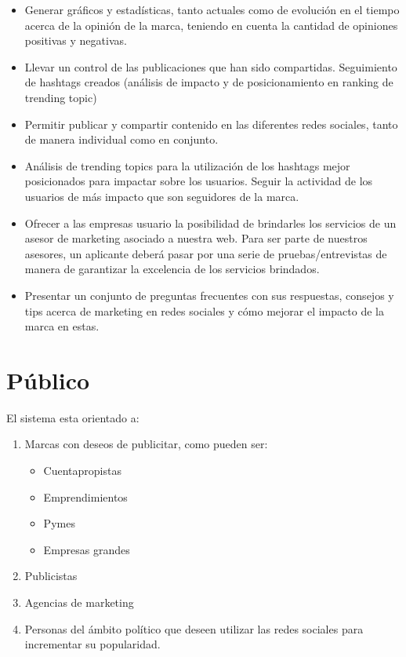 \documentclass[oneside]{book}
\begin{document}
\begin{itemize}
\item Generar gráficos y estad\'{i}sticas, tanto actuales como de evoluci\'{o}n en el tiempo acerca de la opini\'{o}n de la marca, teniendo en cuenta la cantidad de opiniones positivas y negativas.

\item Llevar un control de las publicaciones que han sido compartidas.
Seguimiento de hashtags creados (an\'{a}lisis de impacto y de posicionamiento en ranking de trending topic)

\item Permitir publicar y compartir contenido en las diferentes redes sociales, tanto de manera individual como en conjunto. 

\item Análisis de trending topics para la utilización de los hashtags mejor posicionados para impactar sobre los usuarios.
Seguir la actividad de los usuarios de más impacto que son seguidores de la marca. 

\item Ofrecer a las empresas usuario la posibilidad de brindarles los servicios de un asesor de marketing asociado a nuestra web. Para ser parte de nuestros asesores, un aplicante deber\'{a} pasar por una serie de pruebas/entrevistas de manera de garantizar la excelencia de los servicios brindados. 

\item Presentar un conjunto de preguntas frecuentes con sus respuestas, consejos y tips acerca de marketing en redes sociales y cómo mejorar el impacto de la marca en estas.


\end{itemize}


\section{P\'{u}blico}


El sistema esta orientado a:

\begin{enumerate}
	\item Marcas con deseos de publicitar, como pueden ser:
	\begin{itemize}
		\item Cuentapropistas
		\item Emprendimientos 
		\item Pymes
		\item Empresas grandes
	\end{itemize}
	\item Publicistas
	\item Agencias de marketing
	\item Personas del \'{a}mbito pol\'{i}tico que deseen utilizar las redes sociales para incrementar su popularidad. 
\end{enumerate}
 
\end{document}
